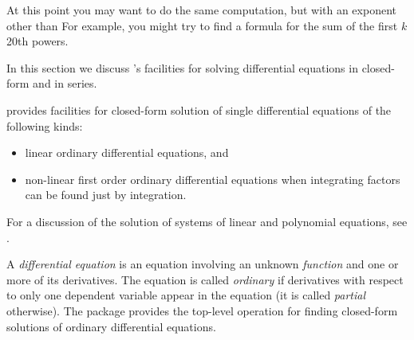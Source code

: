 {{{{{{{{{{{{{{{{At this point you may want to do the same computation, but with an
exponent other than 
For example, you might try to find a formula for the sum of the
first $k$ 20th powers.

%
In this section we discuss \Language{}'s facilities for
solving
differential equations in closed-form and in series.

\Language{} provides facilities for closed-form solution of
single differential equations of the following kinds:
\begin{itemize}
\item linear ordinary differential equations, and
\item non-linear first order ordinary differential equations
when integrating factors can be found just by integration.
\end{itemize}

For a discussion of the solution of systems of linear and polynomial
equations, see
.


A {\it differential equation} is an equation involving an unknown {\it
function} and one or more of its derivatives.
The equation is called {\it ordinary} if derivatives with respect to
only one dependent variable appear in the equation (it is called {\it
partial} otherwise).
The package  provides the
top-level operation  for finding closed-form solutions
of ordinary differential equations.

}}}}}}}}}}}}}}}}
